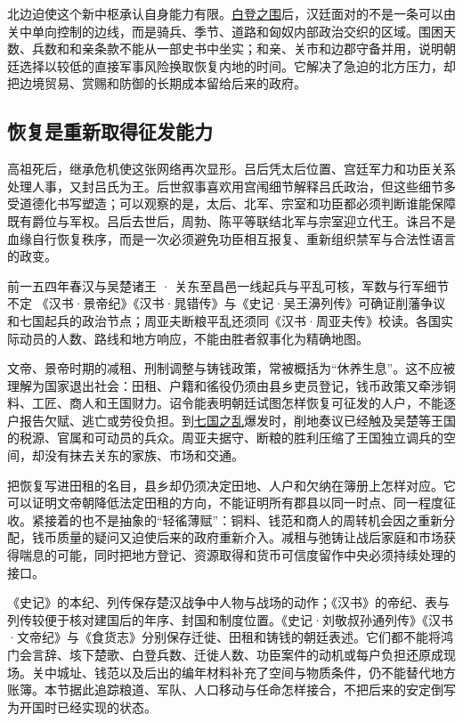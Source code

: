 北边迫使这个新中枢承认自身能力有限。\hyperlink{evt:WH-0200-BAIDENG}{白登之围}后，汉廷面对的不是一条可以由关中单向控制的边线，而是骑兵、季节、道路和匈奴内部政治交织的区域。围困天数、兵数和和亲条款不能从一部史书中坐实；和亲、关市和边郡守备并用，说明朝廷选择以较低的直接军事风险换取恢复内地的时间。它解决了急迫的北方压力，却把边境贸易、赏赐和防御的长期成本留给后来的政府。

\subsection{恢复是重新取得征发能力}

高祖死后，继承危机使这张网络再次显形。吕后凭太后位置、宫廷军力和功臣关系处理人事，又封吕氏为王。后世叙事喜欢用宫闱细节解释吕氏政治，但这些细节多受道德化书写塑造；可以观察的是，太后、北军、宗室和功臣都必须判断谁能保障既有爵位与军权。吕后去世后，周勃、陈平等联结北军与宗室迎立代王。诛吕不是血缘自行恢复秩序，而是一次必须避免功臣相互报复、重新组织禁军与合法性语言的政变。

\begin{event}{}{前一五四年春}{汉与吴楚诸王 · 关东至昌邑一线}{起兵与平乱可核，军数与行军细节不定}
《汉书·景帝纪》《汉书·晁错传》与《史记·吴王濞列传》可确证削藩争议和七国起兵的政治节点；周亚夫断粮平乱还须同《汉书·周亚夫传》校读。各国实际动员的人数、路线和地方响应，不能由胜者叙事化为精确地图。
\end{event}

文帝、景帝时期的减租、刑制调整与铸钱政策，常被概括为“休养生息”。这不应被理解为国家退出社会：田租、户籍和徭役仍须由县乡吏员登记，钱币政策又牵涉铜料、工匠、商人和王国财力。诏令能表明朝廷试图怎样恢复可征发的人户，不能逐户报告欠赋、逃亡或劳役负担。到\hyperlink{evt:WH-0154-CUOFAN}{七国之乱}爆发时，削地奏议已经触及吴楚等王国的税源、官属和可动员的兵众。周亚夫据守、断粮的胜利压缩了王国独立调兵的空间，却没有抹去关东的家族、市场和交通。

把恢复写进田租的名目，县乡却仍须决定田地、人户和欠纳在簿册上怎样对应。它可以证明文帝朝降低法定田租的方向，不能证明所有郡县以同一时点、同一程度征收。紧接着的也不是抽象的“轻徭薄赋”：铜料、钱范和商人的周转机会因之重新分配，钱币质量的疑问又迫使后来的政府重新介入。减租与弛铸让战后家庭和市场获得喘息的可能，同时把地方登记、资源取得和货币可信度留作中央必须持续处理的接口。

\begin{sourcenote}[开国叙事能证实什么]
《史记》的本纪、列传保存楚汉战争中人物与战场的动作；《汉书》的帝纪、表与列传较便于核对建国后的年序、封国和制度位置。《史记·刘敬叔孙通列传》《汉书·文帝纪》与《食货志》分别保存迁徙、田租和铸钱的朝廷表述。它们都不能将鸿门会言辞、垓下楚歌、白登兵数、迁徙人数、功臣案件的动机或每户负担还原成现场。关中城址、钱范以及后出的编年材料补充了空间与物质条件，仍不能替代地方账簿。本节据此追踪粮道、军队、人口移动与任命怎样接合，不把后来的安定倒写为开国时已经实现的状态。
\end{sourcenote}
